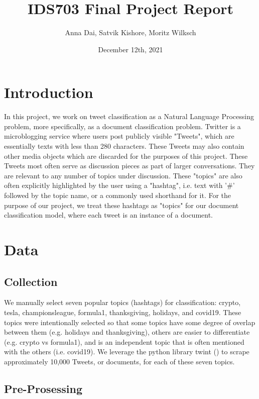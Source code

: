 \documentclass[11pt]{article}
\title{\vspace{-1.5cm}IDS703 Final Project Report}
\author{Anna Dai, Satvik Kishore, Moritz Wilksch}
\date{December 12th, 2021}
\begin{document}
\maketitle

\section{Introduction}

In this project, we work on tweet classification as a Natural Language Processing problem, more specifically, as a document classification problem. Twitter is a microblogging service where users post publicly visible "Tweets", which are essentially texts with less than 280 characters. These Tweets may also contain other media objects which are discarded for the purposes of this project. These Tweets most often serve as discussion pieces as part of larger conversations. They are relevant to any number of topics under discussion. These "topics" are also often explicitly highlighted by the user using a "hashtag", i.e. text with '\#' followed by the topic name, or a commonly used shorthand for it. For the purpose of our project, we treat these hashtags as "topics" for our document classification model, where each tweet is an instance of a document.

\section{Data}

\subsection{Collection}

We manually select seven popular topics (hashtags) for classification: crypto, tesla, championsleague, formula1, thanksgiving, holidays, and covid19.
These topics were intentionally selected so that some topics have some degree of overlap between them (e.g. holidays and thanksgiving), others are easier to differentiate (e.g. crypto vs formula1), and is an independent topic that is often mentioned with the others (i.e. covid19). We leverage the python library twint (\cite{twint}) to scrape approximately 10,000 Tweets, or documents, for each of these seven topics.

\subsection{Pre-Prosessing}
\end{document}
